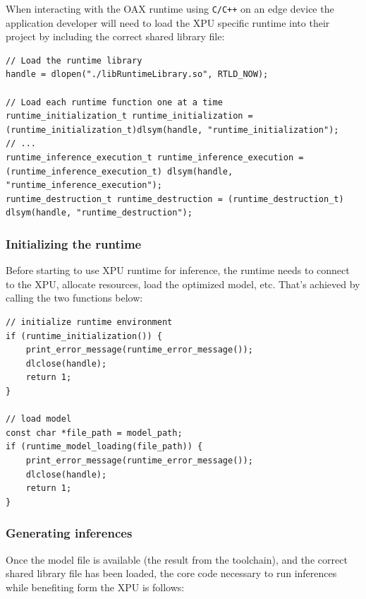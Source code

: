 \documentclass{article}
\begin{document}
When interacting with the OAX runtime using \texttt{C/C++} on an edge device the application developer will need to load the XPU specific runtime into their project by including the correct shared library file:

\begin{lstlisting}
// Load the runtime library
handle = dlopen("./libRuntimeLibrary.so", RTLD_NOW);

// Load each runtime function one at a time
runtime_initialization_t runtime_initialization = (runtime_initialization_t)dlsym(handle, "runtime_initialization");
// ...
runtime_inference_execution_t runtime_inference_execution = (runtime_inference_execution_t) dlsym(handle, "runtime_inference_execution");
runtime_destruction_t runtime_destruction = (runtime_destruction_t) dlsym(handle, "runtime_destruction");
\end{lstlisting}

\subsubsection{Initializing the runtime}

Before starting to use XPU runtime for inference, the runtime needs to connect to the XPU, allocate resources, load the optimized model, etc.
That's achieved by calling the two functions below:

\begin{lstlisting}
// initialize runtime environment
if (runtime_initialization()) {
    print_error_message(runtime_error_message());
    dlclose(handle);
    return 1;
}

// load model
const char *file_path = model_path;
if (runtime_model_loading(file_path)) {
    print_error_message(runtime_error_message());
    dlclose(handle);
    return 1;
}
\end{lstlisting}

\subsubsection{Generating inferences}

Once the model file is available (the result from the toolchain), and the correct shared library file has been loaded, the core code necessary to run inferences while benefiting form the XPU is follows:
\end{document}
